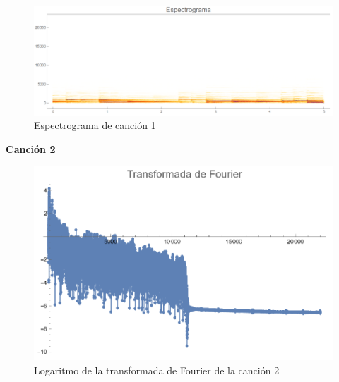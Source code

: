 \documentclass[12pt, letterpaper]{article}
\begin{document}
\begin{figure}[H]
  \centering
  \includegraphics[width=.9\linewidth]{imgs/Cancion1/espectrograma.png}
  \caption{Espectrograma de canción 1}
  \label{fig:01i}
\end{figure}

\textbf{\large{Canción 2}}
\begin{figure}[H]
  \centering
  \includegraphics[width=0.7\linewidth]{imgs/Cancion2/transformada.png}
  \caption{Logaritmo de la transformada de Fourier de la canción 2}
  \label{fig:02a}
\end{figure}
\end{document}
